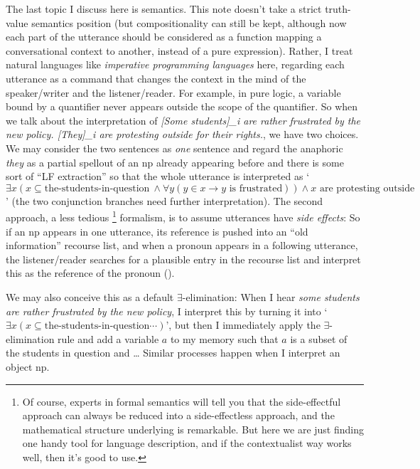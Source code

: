 \documentclass[UTF8, a4paper, oneside, scheme=plain]{ctexrep}
\newcommand{\corpus}[1]{\emph{#1}}
\newcommand{\translate}[1]{`#1'}
\begin{document}
The last topic I discuss here is semantics.
This note doesn't take a strict truth-value semantics position
(but compositionality can still be kept,
although now each part of the utterance should be considered as a function 
mapping a conversational context to another,
instead of a pure expression).
Rather, I treat natural languages like \emph{imperative programming languages} here,
regarding each utterance as a command that changes 
the context in the mind of the speaker/writer and the listener/reader.
For example, in pure logic, 
a variable bound by a quantifier never appears outside the scope of the quantifier.
So when we talk about the interpretation of 
\corpus{[Some students]_{i} are rather frustrated by the new policy. 
[They]_i are protesting outside for their rights.},
we have two choices.
We may consider the two sentences as \emph{one} sentence
and regard the anaphoric \corpus{they} as a partial spellout 
of an \acs{np} already appearing before
and there is some sort of ``LF extraction'' so that the whole utterance is interpreted as 
\translate{$\exists x (x \subseteq \text{the-students-in-question} \  
\land \forall y (y \in x \rightarrow \text{$y$ is frustrated}) )
\land \text{$x$ are protesting outside} $} 
(the two conjunction branches need further interpretation).
The second approach, a less tedious%
\footnote{
    Of course, experts in formal semantics 
    will tell you that the side-effectful approach 
    can always be reduced into a side-effectless approach,
    and the mathematical structure underlying is remarkable.
    But here we are just finding one handy tool for language description,
    and if the contextualist way works well, 
    then it's good to use.
}
formalism, is to assume utterances have \emph{side effects}:
So if an \acs{np} appears in one utterance, 
its reference is pushed into an ``old information'' recourse list,
and when a pronoun appears in a following utterance, 
the listener/reader searches for a plausible entry in the recourse list 
and interpret this as the reference of the pronoun ().

We may also conceive this as a default $\exists$-elimination:
When I hear \corpus{some students are rather frustrated by the new policy},
I interpret this by turning it into 
\translate{$\exists x (x \subseteq \text{the-students-in-question} \cdots)$},
but then I immediately apply the $\exists$-elimination rule 
and add a variable $a$ to my memory such that 
$a$ is a subset of the students in question and \dots
Similar processes happen when I interpret an object \acs{np}.
\end{document}
